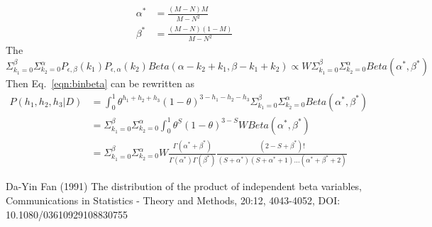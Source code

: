 \documentclass{article}
\begin{document}
\begin{equation}
\begin{split}
\alpha^\ast&=\frac{(M-N)M}{M-N^2}\\
\beta^\ast&=\frac{(M-N)(1-M)}{M-N^2}
\end{split}
\end{equation}
The $\Sigma_{k_1=0}^\beta \Sigma_{k_2=0}^\alpha P_{\epsilon,\beta}(k_1) P_{\epsilon,\alpha}(k_2) Beta(\alpha-k_2+k_1,\beta-k_1+k_2) \propto W\Sigma_{k_1=0}^\beta \Sigma_{k_2=0}^\alpha Beta(\alpha^\ast,\beta^\ast)$
Then Eq.~\ref{eqn:binbeta} can be rewritten as
\begin{equation}
\begin{split}
P(h_1,h_2,h_3|D)&=\int_{0}^1 \theta^{h_1+h_2+h_3}(1-\theta)^{3-h_1-h_2-h_3}\Sigma_{k_1=0}^\beta \Sigma_{k_2=0}^\alpha Beta(\alpha^\ast,\beta^\ast)\\
&=\Sigma_{k_1=0}^\beta \Sigma_{k_2=0}^\alpha\int_{0}^1 \theta^{S}(1-\theta)^{3-S}WBeta(\alpha^\ast,\beta^\ast)\\
&=\Sigma_{k_1=0}^\beta \Sigma_{k_2=0}^\alpha W \frac{\Gamma(\alpha^\ast+\beta^\ast)}{\Gamma(\alpha^\ast)\Gamma(\beta^\ast)}\frac{(2-S+\beta^\ast)!}{(S+\alpha^\ast)(S+\alpha^\ast+1)...(\alpha^\ast+\beta^\ast+2)}
\end{split}
\end{equation}\label{eqn:binbeta}





\begin{thebibliography}{10}
Da-Yin Fan (1991) The distribution of the product of independent beta variables, Communications in
Statistics - Theory and Methods, 20:12, 4043-4052, DOI: 10.1080/03610929108830755
\end{thebibliography}
\end{document}

